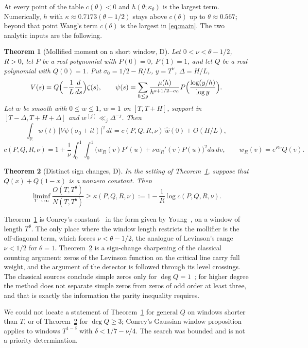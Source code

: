 \documentclass[11pt]{article}
\newtheorem{theorem}{Theorem}[section]
\theoremstyle{remark}
\newcommand{\R}{\mathbb R}
\newcommand{\wh}{\widehat w(0)}
\begin{document}
At every point of the table $c(\theta)<0$ and $h(\theta;\kappa_\theta)$ is the
largest term. Numerically, $h$ with $\kappa\approx0.7173(\theta-1/2)$ stays
above $c(\theta)$ up to $\theta\approx0.567$; beyond that point Wang's term
$c(\theta)$ is the largest in \eqref{eq:main}. The two analytic inputs are the
following.

\begin{theorem}[Mollified moment on a short window, D]\label{thm:moment}
Let $0<\nu<\theta-1/2$, $R>0$, let $P$ be a real polynomial with $P(0)=0$,
$P(1)=1$, and let $Q$ be a real polynomial with $Q(0)=1$. Put
$\sigma_0=1/2-R/L$, $y=T^\nu$, $\Delta=H/L$,
\[
 V(s)=Q\Bigl(-\frac1L\frac{d}{ds}\Bigr)\zeta(s),\qquad
 \psi(s)=\sum_{h\le y}\frac{\mu(h)}{h^{s+1/2-\sigma_0}}
 P\Bigl(\frac{\log(y/h)}{\log y}\Bigr).
\]
Let $w$ be smooth with $0\le w\le1$, $w=1$ on $[T,T+H]$, support in
$[T-\Delta,T+H+\Delta]$ and $w^{(j)}\ll_j\Delta^{-j}$. Then
\[
 \int_\R w(t)\,|V\psi(\sigma_0+it)|^2\,dt=c(P,Q,R,\nu)\,\wh+O(H/L),
\]
\[
 c(P,Q,R,\nu)=1+\frac1\nu\int_0^1\!\!\int_0^1
 \bigl(w_R(v)P'(u)+\nu w_R'(v)P(u)\bigr)^2du\,dv,\qquad w_R(v)=e^{Rv}Q(v).
\]
\end{theorem}

\begin{theorem}[Distinct sign changes, D]\label{thm:signs}
In the setting of Theorem~\ref{thm:moment}, suppose that $Q(x)+Q(1-x)$ is a
nonzero constant. Then
\[
 \liminf_{T\to\infty}\frac{O(T,T^\theta)}{N(T,T^\theta)}\ge
 \kappa(P,Q,R,\nu):=1-\frac1R\log c(P,Q,R,\nu).
\]
\end{theorem}

Theorem~\ref{thm:moment} is Conrey's constant~\cite{Conrey} in the form given
by Young~\cite{Young}, on a window of length $T^\theta$. The only place where
the window length restricts the mollifier is the off-diagonal term, which
forces $\nu<\theta-1/2$, the analogue of Levinson's range $\nu<1/2$ for
$\theta=1$. Theorem~\ref{thm:signs} is a sign-change sharpening of the
classical counting argument: zeros of the Levinson function on the critical
line carry full weight, and the argument of the detector is followed through
its level crossings. The classical sources conclude simple zeros only for
$\deg Q=1$~\cite{Conrey,BCY}; for higher degree the method does not separate
simple zeros from zeros of odd order at least three, and that is exactly the
information the parity inequality requires.

We could not locate a statement of Theorem~\ref{thm:moment} for general $Q$
on windows shorter than $T$, or of Theorem~\ref{thm:signs} for $\deg Q\ge3$;
Conrey's Gaussian-window proposition~\cite{Conrey} applies to windows
$T^{1-\delta}$ with $\delta<1/7-\nu/4$. The search was bounded and is not a
priority determination.
\end{document}
